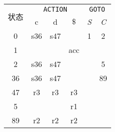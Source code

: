\documentclass[border=1em,varwidth=\maxdimen]{standalone}
\begin{document}
\begin{table}
  \begin{tabular}{cccccc}
    \toprule
    \multirow{2}{*}{状态} & \multicolumn{3}{c}{\texttt{ACTION}} &
                                                                  \multicolumn{2}{c}{\texttt{GOTO}}\\
    \cline{2-6}
                          & c & d & \(\$\) & \textit{S} & \textit{C} \\
    \midrule
    0 & s36 & s47 & & 1 & 2\\
    1 & & & acc & & \\
    2 & s36 & s47 & & & 5\\
    36 & s36 & s47 & & & 89\\
    47 & r3 & r3 & r3 & & \\
    5 & & & r1 & & \\
    89 & r2 & r2 & r2 & & \\
    \bottomrule
  \end{tabular}
\end{table}
\end{document}
